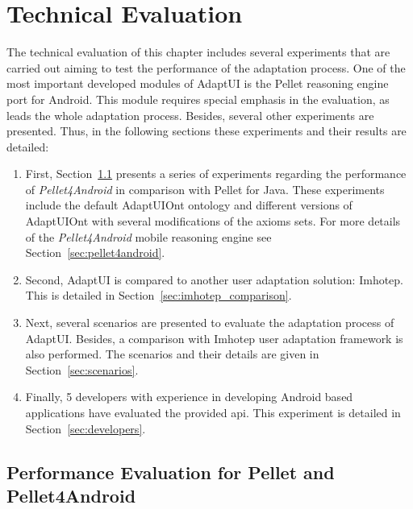 \section{Technical Evaluation}
\label{sec:technical_evaluation}

The technical evaluation of this chapter includes several experiments that are 
carried out aiming to test the performance of the adaptation process. One of 
the most important developed modules of AdaptUI is the Pellet reasoning 
engine port for Android. This module requires special emphasis in the evaluation, 
as leads the whole adaptation process. Besides, several other experiments are 
presented. Thus, in the following sections these experiments and their results 
are detailed:


\begin{enumerate}[label=\alph*)]
  \item First, Section~\ref{sec:performance_evaluation} presents a series 
  of experiments regarding the performance of \textit{Pellet4Android} in 
  comparison with Pellet for Java. These experiments include the default
  AdaptUIOnt ontology and different versions of AdaptUIOnt with several modifications
  of the axioms sets. For more details of the \textit{Pellet4Android} mobile 
  reasoning engine see Section~\ref{sec:pellet4android}.
  
  \item Second, AdaptUI is compared to another user adaptation solution: 
  Imhotep. This is detailed in Section~\ref{sec:imhotep_comparison}.
  
  \item Next, several scenarios are presented to evaluate the adaptation 
  process of AdaptUI. Besides, a comparison with Imhotep user adaptation 
  framework is also performed. The scenarios and their details are given in 
  Section~\ref{sec:scenarios}.
  
  \item Finally, 5 developers with experience in developing Android based 
  applications have evaluated the provided \acs{api}. This experiment is detailed
  in Section~\ref{sec:developers}.
\end{enumerate}


\subsection{Performance Evaluation for Pellet and Pellet4Android}
\label{sec:performance_evaluation}

